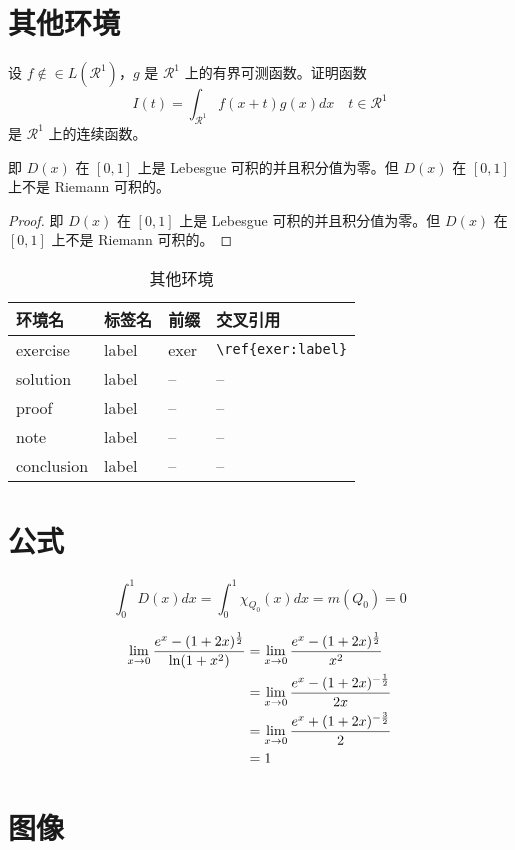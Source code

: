 \documentclass[lang=cn]{elegantbook}
\begin{document}
\section{其他环境}

\begin{exercise}\label{exer:43}
设 $f \notin\in L(\mathcal{R}^1)$，$g$ 是 $\mathcal{R}^1$ 上的有界可测函数。证明函数
\begin{equation}
   \label{ex:1}
   I(t) = \int_{\mathcal{R}^1} f(x+t)g(x)dx \quad t \in \mathcal{R}^1
\end{equation}
是 $\mathcal{R}^1$ 上的连续函数。 
\end{exercise}
\begin{solution}
即 $D(x)$ 在 $[0,1]$ 上是 Lebesgue 可积的并且积分值为零。但 $D(x)$ 在 $[0,1]$ 上不是 Riemann 可积的。
\end{solution}

\begin{proof}
即 $D(x)$ 在 $[0,1]$ 上是 Lebesgue 可积的并且积分值为零。但 $D(x)$ 在 $[0,1]$ 上不是 Riemann 可积的。
\end{proof}

\begin{table}[htbp]
  \centering
  \caption{其他环境}
    \begin{tabular}{llll}
    \toprule
    环境名 & 标签名 & 前缀 & 交叉引用 \\
    \midrule
    exercise & label & exer   & \lstinline|\ref{exer:label}| \\
    solution & label & -- & -- \\
    proof & label & -- & -- \\
    note & label & -- & -- \\
    conclusion & label & -- & -- \\
    \bottomrule
    \end{tabular}%
  \label{tab:theorem-class}%
\end{table}%

\section{公式}
\begin{equation}
    \label{inter2}
    \int_0^1 D(x)dx = \int_0^1 \chi_{Q_0} (x) dx = m(Q_0) = 0
\end{equation}


    
\begin{align}
  \lim_{x\to 0} \frac{e^x-(1+2x)^\frac{1}{2}}{\ln (1+x^2)} &= \lim_{x\to 0} \frac{e^x-(1+2x)^\frac{1}{2}}{x^2}\notag\\
  &= \lim_{x\to 0} \frac{e^x-(1+2x)^{-\frac{1}{2}}}{2x}\notag\\
  &= \lim_{x\to 0} \frac{e^x+(1+2x)^{-\frac{3}{2}}}{2}\notag\\
  &= 1
\end{align}


\section{图像}
\end{document}
